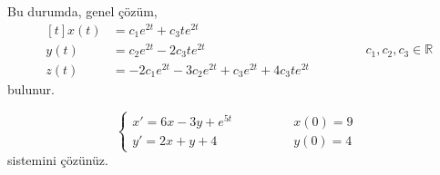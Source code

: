 \documentclass[11pt,a4paper]{article}
\begin{document}
\begin{cozum}
\[\]
Bu durumda, genel çözüm,
\[
\begin{aligned}[t] x(t) &= c_1e^{2t} + c_3te^{2t} \\ y(t) &= c_2e^{2t} - 2c_3te^{2t} \\ z(t) &= -2c_1e^{2t} - 3c_2e^{2t} + c_3e^{2t} + 4c_3te^{2t} \end{aligned} \qquad\qquad c_1, c_2, c_3 \in \mathbb{R}
\]
bulunur.
\end{cozum}

\begin{ornek}[3]
\[
\begin{cases} x' = 6x - 3y + e^{5t} & \qquad\qquad x(0) = 9 \\[2mm] y' = 2x + y + 4 & \qquad\qquad y(0) = 4 \end{cases}
\]
sistemini çözünüz.
\end{ornek}
\end{document}
